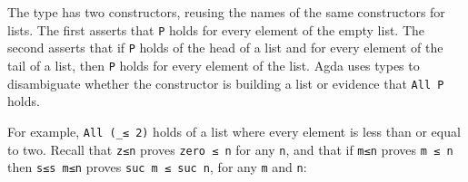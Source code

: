\begin{fence}
\begin{code}%
\>[0]\AgdaSpace{}%
\AgdaSpace{}%
\AgdaSymbol{\{}\AgdaSpace{}%
\AgdaSymbol{:}\AgdaSpace{}%
\AgdaSymbol{\}}\AgdaSpace{}%
\AgdaSymbol{(}\AgdaSpace{}%
\AgdaSymbol{:}\AgdaSpace{}%
\AgdaSpace{}%
\AgdaSpace{}%
\AgdaSymbol{)}\AgdaSpace{}%
\AgdaSymbol{:}\AgdaSpace{}%
\AgdaSpace{}%
\AgdaSpace{}%
\AgdaSpace{}%
\AgdaSpace{}%
\<%
\\
\>[0][@{}l@{\AgdaIndent{0}}]%
\>[2]\AgdaInductiveConstructor{[]}%
\>[6]\AgdaSymbol{:}\AgdaSpace{}%
\AgdaSpace{}%
\AgdaSpace{}%
\AgdaInductiveConstructor{[]}\<%
\\
%
\>[2]\AgdaSpace{}%
\AgdaSymbol{:}\AgdaSpace{}%
\AgdaSpace{}%
\AgdaSymbol{\{}\AgdaSpace{}%
\AgdaSymbol{:}\AgdaSpace{}%
\AgdaSymbol{\}}\AgdaSpace{}%
\AgdaSymbol{\{}\AgdaSpace{}%
\AgdaSymbol{:}\AgdaSpace{}%
\AgdaSpace{}%
\AgdaSymbol{\}}\AgdaSpace{}%
\AgdaSpace{}%
\AgdaSpace{}%
\AgdaSpace{}%
\AgdaSpace{}%
\AgdaSpace{}%
\AgdaSpace{}%
\AgdaSpace{}%
\AgdaSpace{}%
\AgdaSpace{}%
\AgdaSpace{}%
\AgdaSymbol{(}\AgdaSpace{}%
\AgdaSpace{}%
\AgdaSymbol{)}\<%
\end{code}
\end{fence}

The type has two constructors, reusing the names of the same
constructors for lists. The first asserts that \texttt{P} holds for
every element of the empty list. The second asserts that if \texttt{P}
holds of the head of a list and for every element of the tail of a list,
then \texttt{P} holds for every element of the list. Agda uses types to
disambiguate whether the constructor is building a list or evidence that
\texttt{All\ P} holds.

For example, \texttt{All\ (\_≤\ 2)} holds of a list where every element
is less than or equal to two. Recall that \texttt{z≤n} proves
\texttt{zero\ ≤\ n} for any \texttt{n}, and that if \texttt{m≤n} proves
\texttt{m\ ≤\ n} then \texttt{s≤s\ m≤n} proves
\texttt{suc\ m\ ≤\ suc\ n}, for any \texttt{m} and \texttt{n}:

